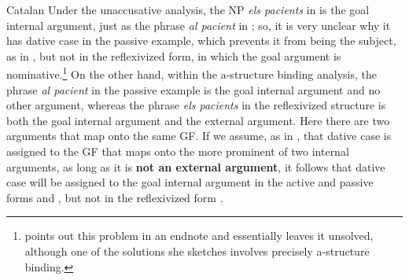 \documentclass[output=paper,hidelinks]{langscibook}
\begin{document}
\ea\label{ex:Romance:33} Catalan
\z\z
Under the unaccusative analysis, the NP \textit{els pacients} in  is the goal internal argument, just as the phrase \textit{al pacient} in ; so, it is very unclear why it has dative case in the passive example, which prevents it from being the subject, as in , but not in the reflexivized form, in which the goal argument is nominative.\footnote{\citet[184]{Grimshaw90} points out this problem in an endnote and essentially leaves it unsolved, although one of the solutions she sketches involves precisely a-structure binding.} On the other hand, within the a-structure binding analysis, the phrase \textit{al pacient} in the passive example  is the goal internal argument and no other argument, whereas the phrase \textit{els pacients} in the reflexivized structure  is both the goal internal argument and the external argument. Here there are two arguments that map onto the same GF. If we assume, as in \citet{alsina1996the-role}, that dative case is assigned to the GF that maps onto the more prominent of two internal arguments, as long as it is \textbf{not an external argument}, it follows that dative case will be assigned to the goal internal argument in the active and passive forms  and , but not in the reflexivized form . 
\end{document}

